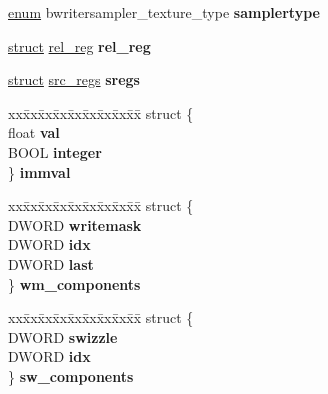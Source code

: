 \begin{DoxyCompactItemize}
\begin{tabbing}
\end{tabbing}\item 
\mbox{\label{union_y_y_s_t_y_p_e_ad01cb27481151d236e46cb540c7ac823}} 
\hyperlink{interfaceenum}{enum} bwritersampler\+\_\+texture\+\_\+type {\bfseries samplertype}
\item 
\mbox{\label{union_y_y_s_t_y_p_e_a814acee1af60a283dc2beef046e489c1}} 
\hyperlink{interfacestruct}{struct} \hyperlink{structrel__reg}{rel\+\_\+reg} {\bfseries rel\+\_\+reg}
\item 
\mbox{\label{union_y_y_s_t_y_p_e_af087510ea2e8fb6950f7c5ea3f3e0ae6}} 
\hyperlink{interfacestruct}{struct} \hyperlink{structsrc__regs}{src\+\_\+regs} {\bfseries sregs}
\item 
\mbox{\label{union_y_y_s_t_y_p_e_a2350bffe72874c8c101255660a2bfce7}} 
\begin{tabbing}
xx\=xx\=xx\=xx\=xx\=xx\=xx\=xx\=xx\=\kill
struct \{\\
\>float {\bfseries val}\\
\>BOOL {\bfseries integer}\\
\} {\bfseries immval}\\

\end{tabbing}\item 
\mbox{\label{union_y_y_s_t_y_p_e_a875c7a4bc7dc1378998d61292452ed61}} 
\begin{tabbing}
xx\=xx\=xx\=xx\=xx\=xx\=xx\=xx\=xx\=\kill
struct \{\\
\>DWORD {\bfseries writemask}\\
\>DWORD {\bfseries idx}\\
\>DWORD {\bfseries last}\\
\} {\bfseries wm\_components}\\

\end{tabbing}\item 
\mbox{\label{union_y_y_s_t_y_p_e_a4d1f8bd0cc16f8c563ca76347fa297b5}} 
\begin{tabbing}
xx\=xx\=xx\=xx\=xx\=xx\=xx\=xx\=xx\=\kill
struct \{\\
\>DWORD {\bfseries swizzle}\\
\>DWORD {\bfseries idx}\\
\} {\bfseries sw\_components}\\


\end{tabbing}
\end{DoxyCompactItemize}
